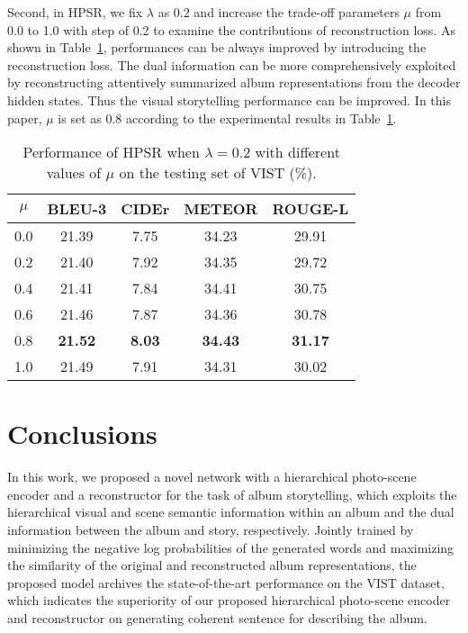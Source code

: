\documentclass[letterpaper]{article} \usepackage{aaai19}  \usepackage{times}  \usepackage{helvet}  \usepackage{courier}  \usepackage{url}  \usepackage{graphicx}  \usepackage{color}
\begin{document}
Second, in HPSR, we fix $\lambda$ as 0.2 and increase the trade-off parameters $\mu$ from 0.0 to 1.0 with step of 0.2 to examine the contributions of reconstruction loss.
As shown in Table~\ref{table:results_mu}, performances can be always improved by introducing the reconstruction loss.
The dual information can be more comprehensively exploited by reconstructing attentively summarized album representations from the decoder hidden states. Thus the visual storytelling performance can be improved.
In this paper, $\mu$ is set as 0.8 according to the experimental results in Table~\ref{table:results_mu}.

\begin{table}[h]
\begin{center}
\caption{Performance of HPSR when $\lambda=0.2$ with different values of $\mu$ on the testing set of VIST (\%). }
\label{table:results_mu}
\begin{adjustbox}{width=0.345\textwidth}
\begin{tabular}{c|c|c|c|c}
\hline
$\mu$    & BLEU-3 & CIDEr & METEOR  & ROUGE-L \\ \hline
0.0   &21.39 &7.75 &34.23 &29.91 \\
0.2   &21.40 &7.92 &34.35 &29.72 \\
0.4   &21.41 &7.84 &34.41 &30.75 \\
0.6  &21.46 &7.87 &34.36 &30.78 \\
0.8  &\textbf{21.52} &\textbf{8.03} &\textbf{34.43} &\textbf{31.17} \\
1.0  &21.49 &7.91 &34.31 &30.02 \\
\hline
\end{tabular}
\end{adjustbox}
\end{center}
\end{table}

















\section{Conclusions}
In this work, we proposed a novel network with a hierarchical photo-scene encoder and a reconstructor for the task of album storytelling, which exploits the hierarchical visual and scene semantic information within an album and the dual information between the album and story, respectively.
Jointly trained by minimizing the negative log probabilities of the generated words and maximizing the similarity of the original and reconstructed album representations, the proposed model archives the state-of-the-art performance on the VIST dataset, which indicates the superiority of our proposed hierarchical photo-scene encoder and reconstructor on generating coherent sentence for describing the album.
\end{document}
